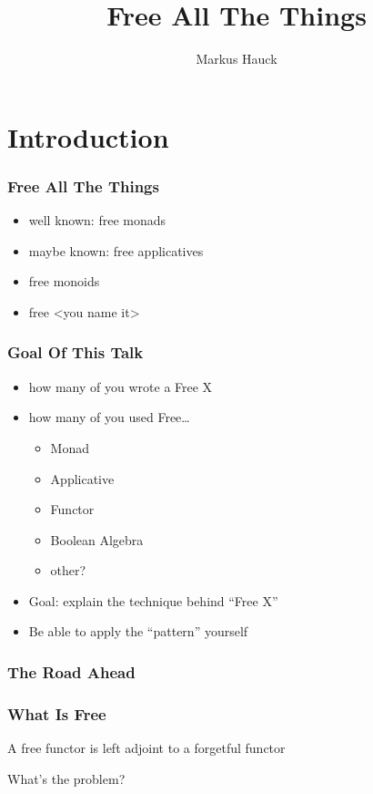 \documentclass{beamer}
\title{Free All The Things}
\author{Markus Hauck}
\begin{document}
\begin{frame}
  \titlepage{}
\end{frame}

\section{Introduction}\label{sec:introduction}

\begin{frame}
\frametitle{Free All The Things}
\begin{itemize}
\item well known: free monads
\item maybe known: free applicatives
\item free monoids
\item free <you name it>
\end{itemize}
\end{frame}

\begin{frame}
  \frametitle{Goal Of This Talk}
  \begin{itemize}
  \item how many of you wrote a Free X
  \item how many of you used Free\ldots
    \begin{itemize}
    \item Monad
    \item Applicative
    \item Functor
    \item Boolean Algebra
    \item other?
    \end{itemize}
  \item Goal: explain the technique behind ``Free X''
  \item Be able to apply the ``pattern'' yourself
  \end{itemize}
\end{frame}

\begin{frame}
  \frametitle{The Road Ahead}
\end{frame}

\begin{frame}
  \frametitle{What Is Free}
  A free functor is left adjoint to a forgetful functor
  \vspace{1cm}
  \begin{center}
    What's the problem?
  \end{center}
\end{frame}
\end{document}
